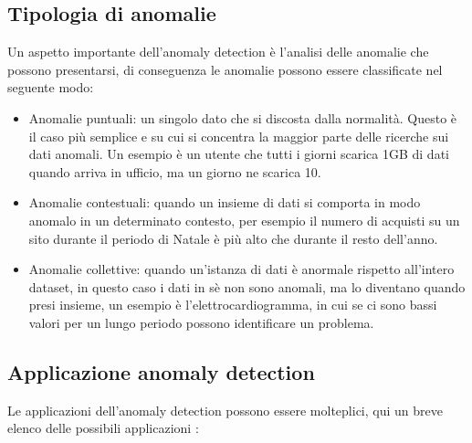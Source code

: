 \subsection{Tipologia di anomalie}
Un aspetto importante dell'anomaly detection è l'analisi delle anomalie che possono presentarsi, di conseguenza le anomalie possono essere classificate nel seguente modo:
\begin{itemize}
    \item Anomalie puntuali: un singolo dato che si discosta dalla normalità. Questo è il caso più semplice e su cui si concentra la maggior parte delle ricerche sui dati anomali. Un esempio è un utente che tutti i giorni scarica 1GB di dati quando arriva in ufficio, ma un giorno ne scarica 10.
    \item Anomalie contestuali: quando un insieme di dati si comporta in modo anomalo in un determinato contesto, per esempio il numero di acquisti su un sito durante il periodo di Natale è più alto che durante il resto dell'anno.
    \item Anomalie collettive: quando un'istanza di dati è anormale rispetto all'intero dataset, in questo caso i dati in sè non sono anomali, ma lo diventano quando presi insieme, un esempio è l'elettrocardiogramma, in cui se ci sono bassi valori per un lungo periodo possono identificare un problema.
\end{itemize}

\subsection{Applicazione anomaly detection}

Le applicazioni dell'anomaly detection possono essere molteplici, qui un breve elenco delle possibili applicazioni \cite{anomaly_detection_survey_3}:

